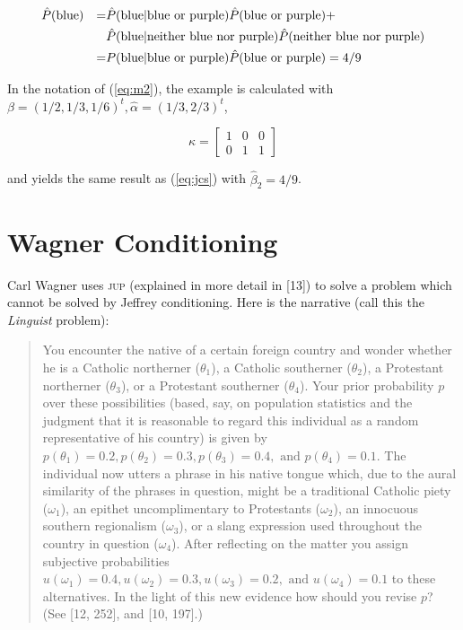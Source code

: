 \documentclass[entropy,article,submit,oneauthor,pdftex,12pt,a4paper]{mdpi}
\newenvironment{quotex}{\begin{quote}\begin{footnotesize}}{\end{footnotesize}\end{quote}}
\begin{document}
\begin{align}
  \label{eq:jcs}
&\hat{P}(\mbox{blue})&=&\hat{P}(\mbox{blue}|\mbox{blue or purple})\hat{P}(\mbox{blue or
  purple})+\notag \\
&&&\hat{P}(\mbox{blue}|\mbox{neither blue nor
  purple})\hat{P}(\mbox{neither blue nor purple})\notag \\
&&=&P(\mbox{blue}|\mbox{blue or purple})\hat{P}(\mbox{blue or
  purple})=4/9
\end{align}

{\noindent}In the notation of (\ref{eq:m2}), the example is calculated
with $\beta=(1/2,1/3,1/6)^{t},\hat{\alpha}=(1/3,2/3)^{t}$,

\begin{equation}
  \label{eq:kappa}
  \kappa=\left[
  \begin{array}{ccc}
    1 & 0 & 0 \\
    0 & 1 & 1
  \end{array}\right]
\end{equation}

{\noindent}and yields the same result as (\ref{eq:jcs}) with
$\hat{\beta}_{2}=4/9$.

\section{Wagner Conditioning}
\label{wc}

Carl Wagner uses \textsc{jup} (explained in more detail in [13]) to
solve a problem which cannot be solved by Jeffrey conditioning. Here
is the narrative (call this the \emph{Linguist} problem):

\begin{quotex}
  You encounter the native of a certain foreign country and wonder
  whether he is a Catholic northerner ($\theta_{1}$), a Catholic
  southerner ($\theta_{2}$), a Protestant northerner ($\theta_{3}$),
  or a Protestant southerner ($\theta_{4}$). Your prior probability
  $p$ over these possibilities (based, say, on population statistics
  and the judgment that it is reasonable to regard this individual as
  a random representative of his country) is given by
  $p(\theta_{1})=0.2,p(\theta_{2})=0.3,p(\theta_{3})=0.4,\mbox{ and
  }p(\theta_{4})=0.1$. The individual now utters a phrase in his
  native tongue which, due to the aural similarity of the phrases in
  question, might be a traditional Catholic piety ($\omega_{1}$), an
  epithet uncomplimentary to Protestants ($\omega_{2}$), an innocuous
  southern regionalism ($\omega_{3}$), or a slang expression used
  throughout the country in question ($\omega_{4}$). After reflecting
  on the matter you assign subjective probabilities
  $u(\omega_{1})=0.4,u(\omega_{2})=0.3,u(\omega_{3})=0.2,\mbox{ and
  }u(\omega_{4})=0.1$ to these alternatives. In the light of this new
  evidence how should you revise $p$? (See [12, 252], and [10, 197].)
\end{quotex}
\end{document}
